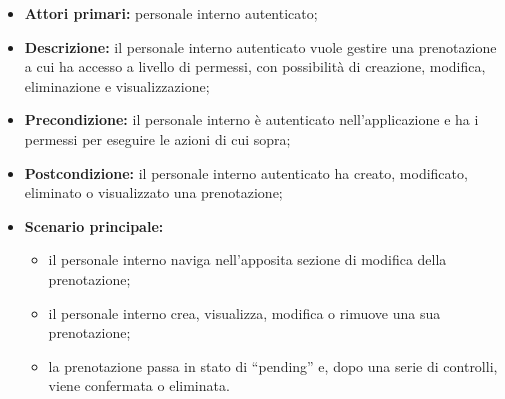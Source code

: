 \begin{itemize}
\item \textbf{Attori primari:} personale interno autenticato;
\item \textbf{Descrizione:} il personale interno autenticato vuole gestire una prenotazione a cui ha accesso a livello di permessi, con possibilità di creazione, modifica, eliminazione e visualizzazione;
\item \textbf{Precondizione:} il personale interno è autenticato nell’applicazione e ha i permessi per eseguire le azioni di cui sopra;
\item \textbf{Postcondizione:} il personale interno autenticato ha creato, modificato, eliminato o visualizzato una prenotazione;
\item \textbf{Scenario principale:} 
	\begin{itemize}
		\item il personale interno naviga nell’apposita sezione di modifica della prenotazione;
		\item il personale interno crea, visualizza, modifica o rimuove una sua prenotazione;
		\item la prenotazione passa in stato di “pending” e, dopo una serie di controlli, viene confermata o eliminata.
	\end{itemize}
\end{itemize}

